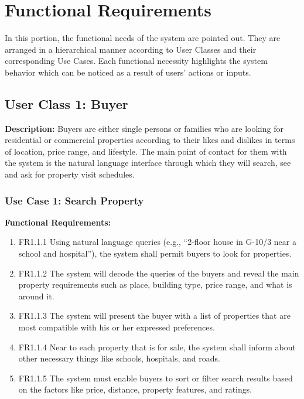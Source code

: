 \section{Functional Requirements}

In this portion, the functional needs of the system are pointed out. They are arranged in a hierarchical manner according to User Classes and their corresponding Use Cases. Each functional necessity highlights the system behavior which can be noticed as a result of users' actions or inputs.

\subsection{User Class 1: Buyer}

\textbf{Description:} Buyers are either single persons or families who are looking for residential or commercial properties according to their likes and dislikes in terms of location, price range, and lifestyle. The main point of contact for them with the system is the natural language interface through which they will search, see and ask for property visit schedules.

\subsubsection{Use Case 1: Search Property}

\textbf{Functional Requirements:}
\begin{enumerate}
    \item FR1.1.1 Using natural language queries (e.g., ``2-floor house in G-10/3 near a school and hospital''), the system shall permit buyers to look for properties.
    \item FR1.1.2 The system will decode the queries of the buyers and reveal the main property requirements such as place, building type, price range, and what is around it.
    \item FR1.1.3 The system will present the buyer with a list of properties that are most compatible with his or her expressed preferences.
    \item FR1.1.4 Near to each property that is for sale, the system shall inform about other necessary things like schools, hospitals, and roads.
    \item FR1.1.5 The system must enable buyers to sort or filter search results based on the factors like price, distance, property features, and ratings.
\end{enumerate}

